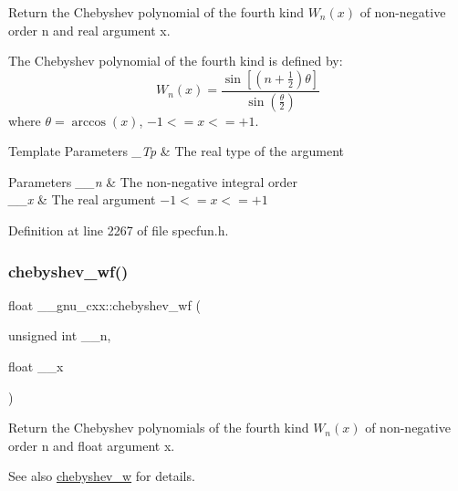 Return the Chebyshev polynomial of the fourth kind $ W_n(x) $ of non-\/negative order {\ttfamily n} and real argument {\ttfamily x}.

The Chebyshev polynomial of the fourth kind is defined by\+: \[ W_n(x) = \frac{\sin \left[ \left(n+\frac{1}{2}\right)\theta \right]} {\sin \left(\frac{\theta}{2}\right)} \] where $ \theta = \arccos(x) $, $ -1 <= x <= +1 $.


\begin{DoxyTemplParams}{Template Parameters}
{\em \+\_\+\+Tp} & The real type of the argument \\
\hline
\end{DoxyTemplParams}

\begin{DoxyParams}{Parameters}
{\em \+\_\+\+\_\+n} & The non-\/negative integral order \\
\hline
{\em \+\_\+\+\_\+x} & The real argument $ -1 <= x <= +1 $ \\
\hline
\end{DoxyParams}


Definition at line 2267 of file specfun.\+h.

\mbox{\label{group__mathsf__gnu_gae6d468cee53df584e40afe294127b090}} 
\subsubsection{\texorpdfstring{chebyshev\+\_\+wf()}{chebyshev\_wf()}}
{\footnotesize\ttfamily float \+\_\+\+\_\+gnu\+\_\+cxx\+::chebyshev\+\_\+wf (\begin{DoxyParamCaption}\item[{unsigned int}]{\+\_\+\+\_\+n,  }\item[{float}]{\+\_\+\+\_\+x }\end{DoxyParamCaption})\hspace{0.3cm}{\ttfamily [inline]}}

Return the Chebyshev polynomials of the fourth kind $ W_n(x) $ of non-\/negative order {\ttfamily n} and {\ttfamily float} argument {\ttfamily x}.

\begin{DoxySeeAlso}{See also}
\hyperlink{group__mathsf__gnu_gaa156c6c21e99104ebcb627e92aceada0}{chebyshev\+\_\+w} for details. 
\end{DoxySeeAlso}


